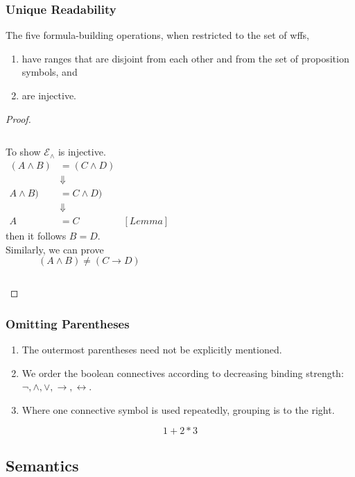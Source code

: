 \documentclass[UTF8,11pt,colorlinks,compress,openany]{beamer}%
\begin{document}
\begin{frame}\frametitle{Unique Readability}
	\begin{theorem}
		The five formula-building operations, when restricted to the set of wffs,
		\begin{enumerate}
			\item have ranges that are disjoint from each other and from the set of proposition symbols, and
			\item are injective.
		\end{enumerate}
	\end{theorem}
	\begin{proof}
		\begin{columns}
				To show $\mathcal{E}_\wedge$ is injective.
				\begin{align*}
				(A\wedge B)&=(C\wedge D)\\
				&\Downarrow\\
				 A\wedge B)&=C\wedge D)\\
				&\Downarrow\\
				 A&=C &[Lemma]
				\end{align*}
				then it follows $B=D$.\\
				
				Similarly, we can prove
				\[(A\wedge B)\neq(C\to D)\]
		\end{columns}
	\end{proof}
\end{frame}

\begin{frame}\frametitle{Omitting Parentheses}
	\begin{enumerate}
		\item The outermost parentheses need not be explicitly mentioned.
		\item We order the boolean connectives according to decreasing binding strength: $\neg, \wedge, \vee, \to, \leftrightarrow$.
		\item Where one connective symbol is used repeatedly, grouping is to the right.
	\end{enumerate}
	\[1+2*3\]
\end{frame}

\subsection{Semantics}
\end{document}

